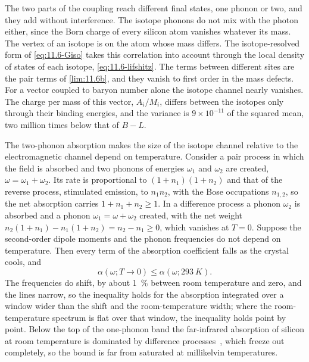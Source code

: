 \noindent The two parts of the coupling reach different final states, one phonon or two, and they add without interference. The isotope phonons do not mix with the photon either, since the Born charge of every silicon atom vanishes whatever its mass. The vertex of an isotope is on the atom whose mass differs. The isotope-resolved form of \cref{eq:11.6-Giso} takes this correlation into account through the local density of states of each isotope, \cref{eq:11.6-lifshitz}. The terms between different sites are the pair terms of \cref{lim:11.6b}, and they vanish to first order in the mass defects. For a vector coupled to baryon number alone the isotope channel nearly vanishes. The charge per mass of this vector, $A_i/M_i$, differs between the isotopes only through their binding energies, and the variance is $9\times10^{-11}$ of the squared mean, two million times below that of $B - L$.

The two-phonon absorption makes the size of the isotope channel relative to the electromagnetic channel depend on temperature. Consider a pair process in which the field is absorbed and two phonons of energies $\omega_1$ and $\omega_2$ are created, $\omega = \omega_1 + \omega_2$. Its rate is proportional to $(1 + n_1)(1 + n_2)$ and that of the reverse process, stimulated emission, to $n_1n_2$, with the Bose occupations $n_{1,2}$, so the net absorption carries $1 + n_1 + n_2 \ge 1$. In a difference process a phonon $\omega_2$ is absorbed and a phonon $\omega_1 = \omega + \omega_2$ created, with the net weight $n_2(1 + n_1) - n_1(1 + n_2) = n_2 - n_1 \ge 0$, which vanishes at $T = 0$. Suppose the second-order dipole moments and the phonon frequencies do not depend on temperature. Then every term of the absorption coefficient falls as the crystal cools, and
\begin{equation}
  \alpha(\omega; T \to 0) \le \alpha(\omega; \SI{293}{K}) .
  \label{eq:11.6-Tbound}
\end{equation}
The frequencies do shift, by about \SI{1}{\percent} between room temperature and zero, and the lines narrow, so the inequality holds for the absorption integrated over a window wider than the shift and the room-temperature width; where the room-temperature spectrum is flat over that window, the inequality holds point by point. Below the top of the one-phonon band the far-infrared absorption of silicon at room temperature is dominated by difference processes~\cite{ikezawa1981far}, which freeze out completely, so the bound is far from saturated at millikelvin temperatures.

